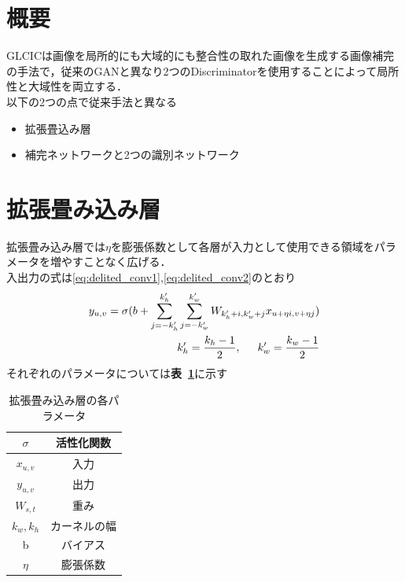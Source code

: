 \documentclass[a4j, 11pt]{jreport}
\newcommand{\tabref}[1]{\textbf{表~\ref{#1}}}
\begin{document}
\section{概要}
GLCICは画像を局所的にも大域的にも整合性の取れた画像を生成する画像補完の手法で，従来のGANと異なり2つのDiscriminatorを使用することによって局所性と大域性を両立する．\\
以下の2つの点で従来手法と異なる
\begin{itemize}
	\item 拡張畳込み層
	\item 補完ネットワークと2つの識別ネットワーク
\end{itemize}
\section{拡張畳み込み層}
拡張畳み込み層では$\eta$を膨張係数として各層が入力として使用できる領域をパラメータを増やすことなく広げる．\\
入出力の式は\eqref{eq:delited_conv1},\eqref{eq:delited_conv2}のとおり
\begin{eqnarray}
	y_{u,v}=\sigma(b+\sum^{k'_h}_{j=-k'_h}\sum^{k'_w}_{j=-k'_w}W_{k'_h+i,k'_w+j}x_{u+\eta i,v+\eta j}) \\ \label{eq:delited_conv1}
	k'_h =\frac{k_h-1}{2},\indent k'_w =\frac{k_w-1}{2}
	\label{eq:delited_conv2}
\end{eqnarray}
それぞれのパラメータについては\tabref{tb:delited_conv}に示す
\begin{table}[H]
	\centering
	\caption{拡張畳み込み層の各パラメータ}
	\begin{tabular}{|c|c|}
	\hline
	$\sigma$ & 活性化関数  \\ \hline
	$x_{u,v}$ & 入力     \\ \hline
	$y_{u,v}$ & 出力     \\ \hline
	$W_{s,t}$& 重み     \\ \hline
	$k_w,k_h$ & カーネルの幅 \\ \hline
	b & バイアス   \\ \hline
	$\eta$ & 膨張係数   \\ \hline
	\end{tabular}
	\label{tb:delited_conv}
\end{table}
\end{document}
